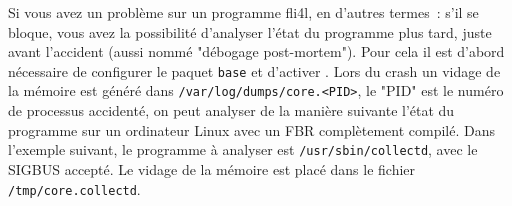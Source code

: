 
Si vous avez un problème sur un programme fli4l, en d'autres termes~: s'il se
bloque, vous avez la possibilité d'analyser l'état du programme plus tard, juste
avant l'accident (aussi nommé "débogage post-mortem"). Pour cela il est d'abord
nécessaire de configurer le paquet \texttt{base} et d'activer .
Lors du crash un vidage de la mémoire est généré dans \texttt{/var/log/dumps/core.<PID>},
le "PID" est le numéro de processus accidenté, on peut analyser de la manière
suivante l'état du programme sur un ordinateur Linux avec un FBR complètement
compilé. Dans l'exemple suivant, le programme à analyser est \texttt{/usr/sbin/collectd},
avec le SIGBUS accepté. Le vidage de la mémoire est placé dans le fichier
\texttt{/tmp/core.collectd}.


